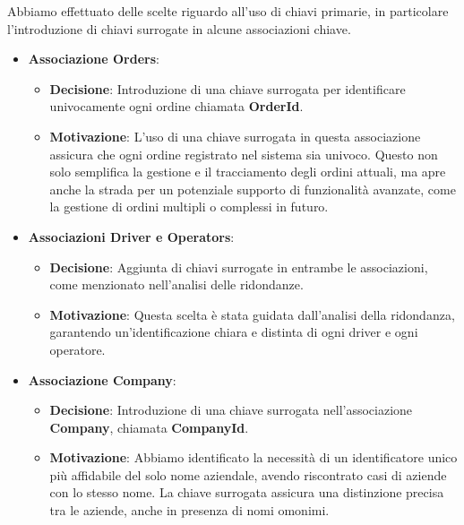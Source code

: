 Abbiamo effettuato delle scelte riguardo all'uso di chiavi primarie, in particolare l'introduzione di chiavi surrogate in alcune associazioni chiave.

\begin{itemize}[leftmargin=*,label={\textbullet},itemsep=0pt,topsep=0pt,partopsep=0pt]
  \item \textbf{Associazione Orders}:
        \begin{itemize}[leftmargin=*,label={\textbullet},itemsep=0pt,topsep=0pt,partopsep=0pt]
          \item \textbf{Decisione}: Introduzione di una chiave surrogata per identificare univocamente ogni ordine chiamata \textbf{OrderId}.
          \item \textbf{Motivazione}: L'uso di una chiave surrogata in questa associazione assicura che ogni ordine registrato nel sistema sia univoco. Questo non solo semplifica la gestione e il tracciamento degli ordini attuali, ma apre anche la strada per un potenziale supporto di funzionalità avanzate, come la gestione di ordini multipli o complessi in futuro.
        \end{itemize}
  \item \textbf{Associazioni Driver e Operators}:
        \begin{itemize}[leftmargin=*,label={\textbullet},itemsep=0pt,topsep=0pt,partopsep=0pt]
          \item \textbf{Decisione}: Aggiunta di chiavi surrogate in entrambe le associazioni, come menzionato nell'analisi delle ridondanze.
          \item \textbf{Motivazione}: Questa scelta è stata guidata dall'analisi della ridondanza, garantendo un'identificazione chiara e distinta di ogni driver e ogni operatore.
        \end{itemize}
  \item \textbf{Associazione Company}:
        \begin{itemize}[leftmargin=*,label={\textbullet},itemsep=0pt,topsep=0pt,partopsep=0pt]
          \item \textbf{Decisione}: Introduzione di una chiave surrogata nell'associazione \textbf{Company}, chiamata \textbf{CompanyId}.
          \item \textbf{Motivazione}: Abbiamo identificato la necessità di un identificatore unico più affidabile del solo nome aziendale, avendo riscontrato casi di aziende con lo stesso nome. La chiave surrogata assicura una distinzione precisa tra le aziende, anche in presenza di nomi omonimi.
        \end{itemize}
\end{itemize}

